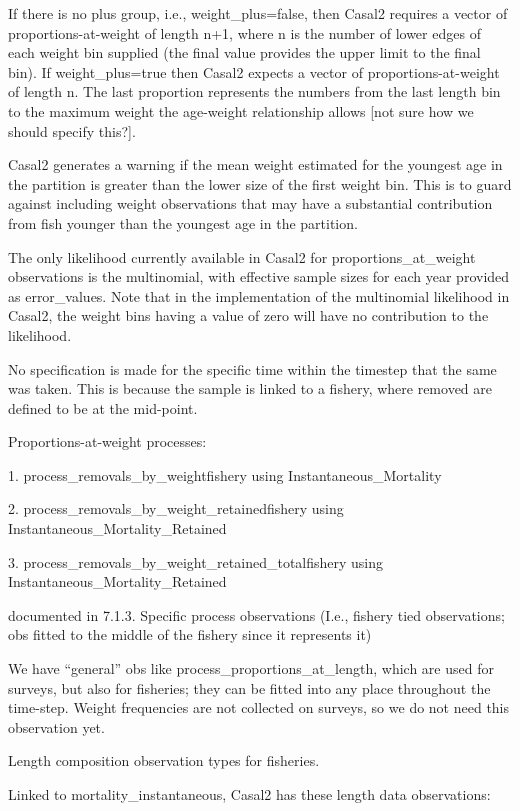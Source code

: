 \documentclass[a4paper,11pt,twoside,pdftex,draft]{article}
\begin{document}
If there is no plus group, i.e., weight\_plus=false, then Casal2 requires a vector of proportions-at-weight of length n+1, where n is the number of lower edges of each weight bin supplied (the final value provides the upper limit to the final bin). If weight\_plus=true then Casal2 expects a vector of proportions-at-weight of length n. The last proportion represents the numbers from the last length bin to the maximum weight the age-weight relationship allows [not sure how we should specify this?].

Casal2 generates a warning if the mean weight estimated for the youngest age in the partition is greater than the lower size of the first weight bin. This is to guard against including weight observations that may have a substantial contribution from fish younger than the youngest age in the partition.

The only likelihood currently available in Casal2 for proportions\_at\_weight observations is the multinomial, with effective sample sizes for each year provided as error\_values. Note that in the implementation of the multinomial likelihood in Casal2, the weight bins having a value of zero will have no contribution to the likelihood.

No specification is made for the specific time within the timestep that the same was taken. This is because the sample is linked to a fishery, where removed are defined to be at the mid-point.

Proportions-at-weight processes:

1. process\_removals\_by\_weightfishery using Instantaneous\_Mortality

2. process\_removals\_by\_weight\_retainedfishery using Instantaneous\_Mortality\_Retained

3. process\_removals\_by\_weight\_retained\_totalfishery using Instantaneous\_Mortality\_Retained

documented in 7.1.3. Specific process observations (I.e., fishery tied observations; obs fitted to the middle of the fishery since it represents it)

We have “general” obs like process\_proportions\_at\_length, which are used for surveys, but also for fisheries; they can be fitted into any place throughout the time-step. Weight frequencies are not collected on surveys, so we do not need this observation yet.

Length composition observation types for fisheries.



Linked to mortality\_instantaneous, Casal2 has these length data observations:
\end{document}
